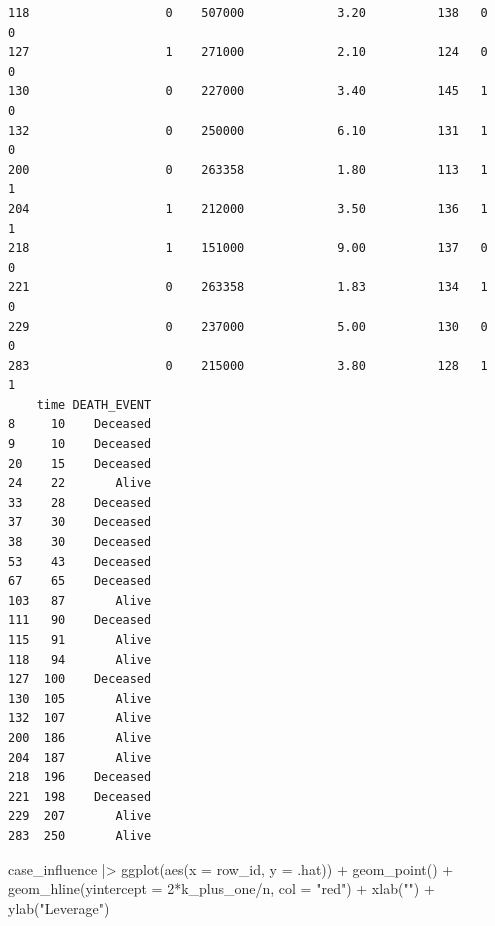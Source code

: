 \documentclass[
  letterpaper,
  DIV=11,
  numbers=noendperiod]{scrartcl}
\newenvironment{Shaded}{\begin{snugshade}}{\end{snugshade}}
\newcommand{\AttributeTok}[1]{\textcolor[rgb]{0.40,0.45,0.13}{#1}}
\newcommand{\DecValTok}[1]{\textcolor[rgb]{0.68,0.00,0.00}{#1}}
\newcommand{\FunctionTok}[1]{\textcolor[rgb]{0.28,0.35,0.67}{#1}}
\newcommand{\NormalTok}[1]{\textcolor[rgb]{0.00,0.23,0.31}{#1}}
\newcommand{\SpecialCharTok}[1]{\textcolor[rgb]{0.37,0.37,0.37}{#1}}
\newcommand{\StringTok}[1]{\textcolor[rgb]{0.13,0.47,0.30}{#1}}
\begin{document}
\begin{verbatim}
118                   0    507000             3.20          138   0       0
127                   1    271000             2.10          124   0       0
130                   0    227000             3.40          145   1       0
132                   0    250000             6.10          131   1       0
200                   0    263358             1.80          113   1       1
204                   1    212000             3.50          136   1       1
218                   1    151000             9.00          137   0       0
221                   0    263358             1.83          134   1       0
229                   0    237000             5.00          130   0       0
283                   0    215000             3.80          128   1       1
    time DEATH_EVENT
8     10    Deceased
9     10    Deceased
20    15    Deceased
24    22       Alive
33    28    Deceased
37    30    Deceased
38    30    Deceased
53    43    Deceased
67    65    Deceased
103   87       Alive
111   90    Deceased
115   91       Alive
118   94       Alive
127  100    Deceased
130  105       Alive
132  107       Alive
200  186       Alive
204  187       Alive
218  196    Deceased
221  198    Deceased
229  207       Alive
283  250       Alive
\end{verbatim}

\begin{Shaded}
\begin{Highlighting}[]
\NormalTok{case\_influence }\SpecialCharTok{|\textgreater{}} \FunctionTok{ggplot}\NormalTok{(}\FunctionTok{aes}\NormalTok{(}\AttributeTok{x =}\NormalTok{ row\_id, }\AttributeTok{y =}\NormalTok{ .hat)) }\SpecialCharTok{+} \FunctionTok{geom\_point}\NormalTok{() }\SpecialCharTok{+} 
  \FunctionTok{geom\_hline}\NormalTok{(}\AttributeTok{yintercept =} \DecValTok{2}\SpecialCharTok{*}\NormalTok{k\_plus\_one}\SpecialCharTok{/}\NormalTok{n, }\AttributeTok{col =} \StringTok{"red"}\NormalTok{) }\SpecialCharTok{+}
  \FunctionTok{xlab}\NormalTok{(}\StringTok{""}\NormalTok{) }\SpecialCharTok{+} \FunctionTok{ylab}\NormalTok{(}\StringTok{"Leverage"}\NormalTok{)}
\end{Highlighting}
\end{Shaded}
\end{document}
